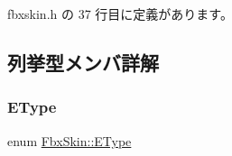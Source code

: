  fbxskin.\+h の 37 行目に定義があります。



\subsection{列挙型メンバ詳解}
\mbox{\label{class_fbx_skin_aee398789ebed22fa97269a26c6049a16}} 
\subsubsection{\texorpdfstring{E\+Type}{EType}}
{\footnotesize\ttfamily enum \hyperlink{class_fbx_skin_aee398789ebed22fa97269a26c6049a16}{Fbx\+Skin\+::\+E\+Type}}

